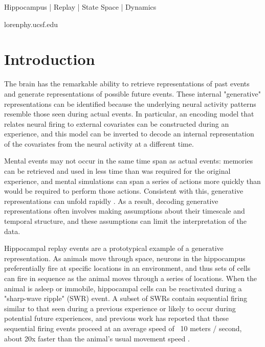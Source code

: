 \documentclass[times, twoside]{zHenriquesLab-StyleBioRxiv}
\begin{document}
\begin{keywords}
Hippocampus | Replay | State Space | Dynamics
\end{keywords}

\begin{corrauthor}
loren\at phy.ucsf.edu
\end{corrauthor}

\section*{Introduction}
The brain has the remarkable ability to retrieve representations of past events and generate representations of possible future events. These internal "generative" representations \cite{KayConstantSubsecondCycling2020} can be identified because the underlying neural activity patterns resemble those seen during actual events. In particular, an encoding model that relates neural firing to external covariates can be constructed during an experience, and this model can be inverted to decode an internal representation of the covariates from the neural activity at a different time.

Mental events may not occur in the same time span as actual events: memories can be retrieved and used in less time than was required for the original experience, and mental simulations can span a series of actions more quickly than would be required to perform those actions. Consistent with this, generative representations can unfold rapidly \cite{NadasdyReplayTimeCompression1999, LeeMemorySequentialExperience2002, DavidsonHippocampalReplayExtended2009, KarlssonAwakereplayremote2009}. As a result, decoding generative representations often involves making assumptions about their timescale and temporal structure, and these assumptions can limit the interpretation of the data. 

Hippocampal replay events are a prototypical example of a generative representation. As animals move through space, neurons in the hippocampus preferentially fire at specific locations in an environment, and thus sets of cells can fire in sequence as the animal moves through a series of locations. When the animal is asleep or immobile, hippocampal cells can be reactivated during a "sharp-wave ripple" (SWR) event. A subset of SWRs contain sequential firing similar to that seen during a previous experience or likely to occur during potential future experiences, and previous work has reported that these sequential firing events proceed at an average speed of ~10 meters / second, about 20x faster than the animal's usual movement speed \cite{NadasdyReplayTimeCompression1999, LeeMemorySequentialExperience2002, DavidsonHippocampalReplayExtended2009, KarlssonAwakereplayremote2009}. 
\end{document}
